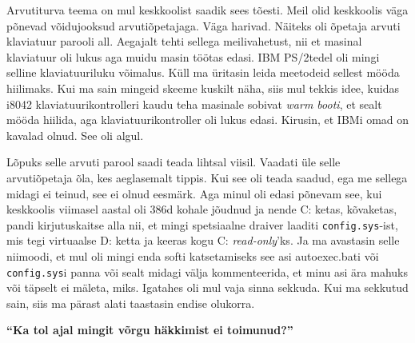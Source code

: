 Arvutiturva teema on mul keskkoolist saadik sees tõesti. Meil olid keskkoolis
väga põnevad võidujooksud arvutiõpetajaga. Väga harivad. Näiteks oli õpetaja
arvuti klaviatuur parooli all. Aegajalt tehti sellega meilivahetust, nii et
masinal klaviatuur oli lukus aga muidu masin töötas edasi. IBM
PS/2tedel oli mingi selline klaviatuuriluku võimalus. Küll ma üritasin
leida meetodeid sellest mööda hiilimaks. Kui ma sain mingeid skeeme kuskilt
näha, siis mul tekkis idee, kuidas i8042 klaviatuurikontrolleri kaudu teha
masinale sobivat \emph{warm booti}, et sealt mööda hiilida, aga
klaviatuurikontroller oli lukus edasi. Kirusin, et IBMi omad on kavalad olnud.
See oli algul.

Lõpuks selle arvuti parool saadi teada lihtsal viisil. Vaadati üle selle
arvutiõpetaja õla, kes aeglasemalt tippis. Kui see oli teada saadud, ega me
sellega midagi ei teinud, see ei olnud eesmärk. Aga minul oli edasi põnevam
see, kui keskkoolis viimasel aastal oli 386d kohale jõudnud ja nende C: ketas,
kõvaketas, pandi kirjutuskaitse alla nii, et mingi spetsiaalne draiver laaditi
\verb|config.sys|-ist, mis tegi virtuaalse D: ketta ja keeras kogu C:
\emph{read-only}'ks. Ja ma avastasin selle niimoodi, et mul oli mingi enda
softi katsetamiseks see asi autoexec.bati või \verb|config.sys|i panna või
sealt midagi välja kommenteerida, et minu asi ära mahuks või täpselt ei mäleta,
miks. Igatahes oli mul vaja sinna sekkuda. Kui ma sekkutud sain, siis ma pärast
alati taastasin endise olukorra.

\textbf{\enquote{Ka tol ajal mingit võrgu häkkimist ei toimunud?}}

